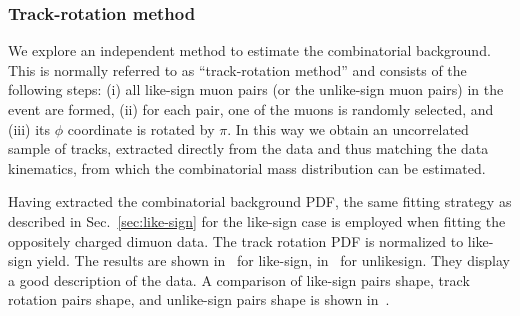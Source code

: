 


\subsubsection{Track-rotation method}
\label{sec:track-rotsation}

We explore an independent method to estimate the combinatorial background. 
This is normally referred to as ``track-rotation method'' and consists of the following steps:
(i) all like-sign muon pairs (or the unlike-sign muon pairs) in the event are formed, 
(ii) for each pair, one of the muons is randomly selected, and 
(iii) its $\phi$ coordinate is rotated by $\pi$. 
In this way we obtain an uncorrelated sample of tracks, extracted directly from the data and thus matching the data kinematics, 
from which the combinatorial mass distribution can be estimated. 

Having extracted the combinatorial background PDF, the same fitting strategy as described in Sec.~\ref{sec:like-sign} for the like-sign case is employed when fitting the oppositely charged dimuon data. The track rotation PDF is normalized to like-sign yield. 
The results are shown in~ for like-sign, in~ for unlikesign. They display a good description of the data.
A comparison of like-sign pairs shape, track rotation pairs shape, and unlike-sign pairs shape is shown in~.


